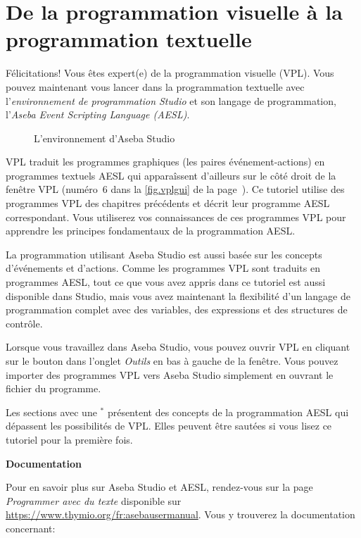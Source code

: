 \part{De la programmation visuelle à la programmation textuelle}
\label{ch.next}

Félicitations!
Vous êtes expert(e) de la programmation visuelle (VPL).
Vous pouvez maintenant vous lancer dans la programmation textuelle
avec l'\textit{environnement de programmation Studio} et son langage de
programmation, l'\textit{Aseba Event Scripting Language (AESL)}.


\begin{figure}[hbt]
\begin{center}
\caption{L'environnement d'Aseba Studio}\label{fig.studio}
\end{center}
\end{figure}

VPL traduit les programmes graphiques (les paires événement-actions) en programmes textuels AESL
qui apparaîssent d'ailleurs sur le côté droit de la fenêtre VPL (numéro~6 dans la \cref{fig.vplgui}
de la page~\pageref{fig.vplgui}).
Ce tutoriel utilise des programmes VPL des chapitres précédents et décrit leur programme AESL correspondant.
Vous utiliserez vos connaissances de ces programmes VPL pour apprendre les principes fondamentaux 
de la programmation AESL.

La programmation utilisant Aseba Studio est aussi basée sur les concepts d'événements et d'actions.
Comme les programmes VPL sont traduits en programmes AESL,
tout ce que vous avez appris dans ce tutoriel est aussi disponible dans Studio,
mais vous avez maintenant la flexibilité d'un langage de programmation complet
avec des variables, des expressions et des structures de contrôle.

Lorsque vous travaillez dans Aseba Studio, vous pouvez ouvrir VPL en cliquant sur le bouton
 dans l'onglet \emph{Outils} en bas à gauche de la fenêtre.
Vous pouvez importer des programmes VPL vers Aseba Studio simplement en ouvrant le fichier du programme.

Les sections avec une $^*$ présentent des concepts de la programmation AESL qui dépassent les 
possibilités de VPL.
Elles peuvent être sautées si vous lisez ce tutoriel pour la première fois.

\newpage

\textbf{\large Documentation}

Pour en savoir plus sur Aseba Studio et AESL, rendez-vous sur la page \emph{Programmer avec du texte}
disponible sur \href{https://www.thymio.org/fr:asebausermanual}{https://www.thymio.org/fr:asebausermanual}.
Vous y trouverez la documentation concernant:

